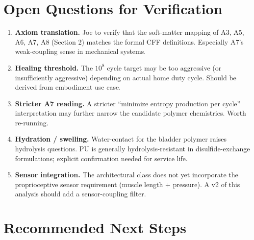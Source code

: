 \documentclass[11pt, a4paper]{article}
\begin{document}
\section{Open Questions for Verification}

\begin{enumerate}[nosep]
  \item \textbf{Axiom translation.} Joe to verify that the
        soft-matter mapping of A3, A5, A6, A7, A8 (Section 2)
        matches the formal CFF definitions. Especially A7's
        weak-coupling sense in mechanical systems.
  \item \textbf{Healing threshold.} The $10^8$ cycle target may
        be too aggressive (or insufficiently aggressive) depending
        on actual home duty cycle. Should be derived from
        embodiment use case.
  \item \textbf{Stricter A7 reading.} A stricter ``minimize entropy
        production per cycle'' interpretation may further narrow
        the candidate polymer chemistries. Worth re-running.
  \item \textbf{Hydration / swelling.} Water-contact for the
        bladder polymer raises hydrolysis questions. PU is
        generally hydrolysis-resistant in disulfide-exchange
        formulations; explicit confirmation needed for service life.
  \item \textbf{Sensor integration.} The architectural class does
        not yet incorporate the proprioceptive sensor requirement
        (muscle length + pressure). A v2 of this analysis should
        add a sensor-coupling filter.
\end{enumerate}

\section{Recommended Next Steps}
\end{document}
